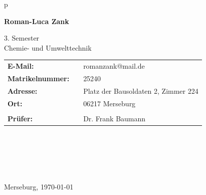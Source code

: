 \begin{center}
\begin{tabular}{p{\textwidth}}
\begin{center}
\Large{\textbf{Roman-Luca Zank}} \\
\end{center}

\begin{center}
3. Semester \\
Chemie- und Umwelttechnik \\
\end{center}


\begin{center}
\begin{tabular}{lll}
	\textbf{E-Mail:} & & romanzank@mail.de\\
	\textbf{Matrikelnummer:} & &25240\\
	\textbf{Adresse:} & &Platz der Bausoldaten 2, Zimmer 224\\
	\textbf{Ort:} & &06217 Merseburg\\
	&& \\
	\textbf{Prüfer:} & & Dr. Frank  Baumann\\
\end{tabular}
\end{center}

\\ \\ \\ \\ \\
\large{Merseburg, \today}

\end{tabular}
\end{center}
